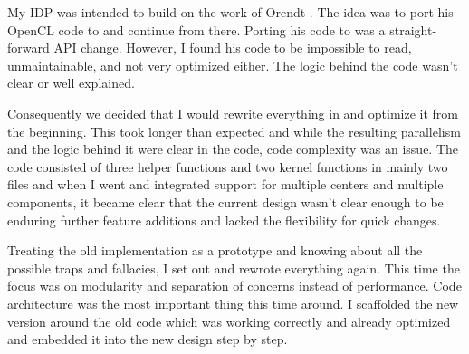 My IDP was intended to build on the work of Orendt \TODO{}. The idea was to port his OpenCL code to \cuda{} and continue from there.
Porting his code to \cuda{} was a straight-forward API change. However, I found his code to be impossible to read, unmaintainable, and not very optimized either. The logic behind the code wasn't clear or well explained.


Consequently we decided that I would rewrite everything in \cuda{} and optimize it from the beginning. This took longer than expected and while the resulting parallelism and the logic behind it were clear in the code, code complexity was an issue. The code consisted of three helper functions and two kernel functions in mainly two files and when I went and integrated support for multiple centers and multiple components, it became clear that the current design wasn't clear enough to be enduring further feature additions and lacked the flexibility for quick changes.


Treating the old implementation as a prototype and knowing about all the possible traps and fallacies, I set out and rewrote everything again. This time the focus was on modularity and separation of concerns instead of performance. Code architecture was the most important thing this time around. I scaffolded the new version around the old code which was working correctly and already optimized and embedded it into the new design step by step.